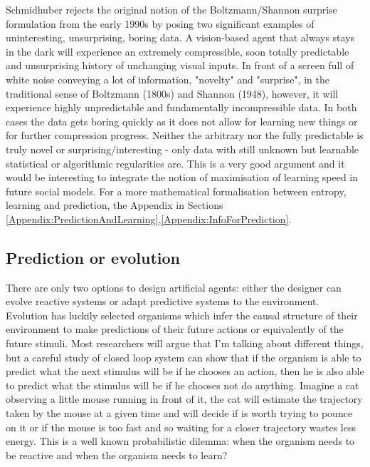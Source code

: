 Schmidhuber rejects the original notion of the Boltzmann/Shannon surprise formulation from the 
early 1990s by posing two significant examples of uninteresting, unsurprising, boring data.
A vision-based agent that always stays in the dark will experience an extremely
 compressible, soon totally predictable and unsurprising history of unchanging
 visual inputs. In front of a screen full of white noise conveying a lot of
 information, "novelty" and "surprise", in the traditional sense of Boltzmann
 (1800s) and Shannon (1948), however, it will experience highly unpredictable
 and fundamentally incompressible data.
In both cases the data gets boring quickly as it does not allow for learning
 new things or for further compression progress.
Neither the arbitrary nor the fully predictable is truly novel or surprising/interesting - 
only data with still unknown but learnable statistical or
algorithmic regularities are. This is a very good argument and it would be
interesting to integrate the notion of maximisation of learning speed in
future social models.
For a more mathematical formalisation between entropy, learning and prediction, the Appendix
in Sections \ref{Appendix:PredictionAndLearning},\ref{Appendix:InfoForPrediction}.

\subsection{Prediction or evolution}
There are only two options to design artificial agents: either the designer 
can evolve reactive systems or adapt predictive systems to the environment.
Evolution has luckily selected organisms which infer the causal structure of
 their environment to make predictions of their future actions or equivalently of
 the future stimuli.
 Most researchers  will argue that I'm talking about different
 things, but a careful study of closed loop system can show that if the organism is
 able to predict what the next stimulus will be if he chooses an action, then he
 is also able to predict what the stimulus will be if he chooses not do anything.
Imagine a cat observing a little mouse running in front of it, the cat will estimate
 the trajectory taken by the mouse at a given time and will decide if is worth trying to pounce 
 on it or if the mouse is too fast and so waiting for a closer trajectory wastes less energy. 
 This is a well known probabilistic dilemma: when the organism needs to be reactive and when the organism 
 needs to learn?

